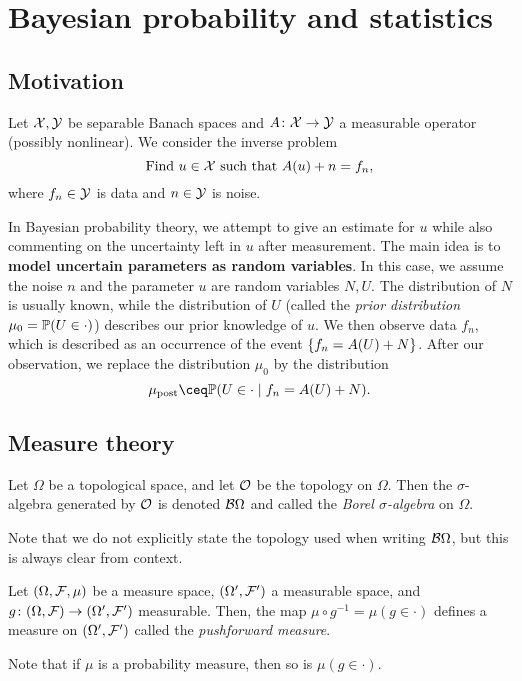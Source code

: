 \section{Bayesian probability and statistics}
\subsection{Motivation}
Let $\mathcal X, \mathcal Y$ be separable Banach spaces and $A \colon \mathcal X\to\mathcal Y$ a measurable operator (possibly nonlinear). We consider the inverse problem
\[
\text{Find $u \in \mathcal X$ such that } A(u) + n = f_n,
\]
where $f_n \in \mathcal Y$ is data and $n \in \mathcal Y$ is noise. 

In Bayesian probability theory, we attempt to give an estimate for $u$ while also commenting on the uncertainty left in $u$ after measurement. The main idea is to \textbf{model uncertain parameters as random variables}. In this case, we assume the noise $n$ and the parameter $u$ are random variables $N, U$. The distribution of $N$ is usually known, while the distribution of $U$ (called the \emph{prior distribution $\mu_0 = \mathbb P(U \in \cdot)$}) describes our prior knowledge of $u$. We then observe data $f_n$, which is described as an occurrence of the event $\qty{f_n = A(U) + N}$. After our observation, we replace the distribution $\mu_0$ by the distribution
\[
\mu_\Rm{post} \ceq \PP(U \in \cdot \mid f_n = A(U) + N). 
\]

\subsection{Measure theory}
\begin{definition}
	Let $\Omega$ be a topological space, and let $\mathcal O$ be the topology on $\Omega$. Then the $\sigma$-algebra generated by $\mathcal O$ is denoted $\mathcal B\Omega$ and called the \emph{Borel $\sigma$-algebra} on $\Omega$. 
\end{definition}
Note that we do not explicitly state the topology used when writing $\mathcal B\Omega$, but this is always clear from context. 

\begin{definition}
	Let $(\Omega, \mathcal F, \mu)$ be a measure space, $(\Omega', \mathcal F')$ a measurable space, and $g \colon (\Omega, \mathcal F) \to (\Omega', \mathcal F')$ measurable. Then, the map $\mu \circ g^{-1} = \mu(g \in \cdot)$ defines a measure on $(\Omega', \mathcal F')$ called the \emph{pushforward measure}. 
	
	Note that if $\mu$ is a probability measure, then so is $\mu(g \in \cdot)$. 
\end{definition}

